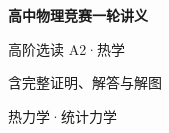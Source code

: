 \documentclass[UTF8,zihao=-4,oneside,openany]{ctexbook}
\begin{document}
\frontmatter
\begin{titlepage}
  \centering
  \vspace*{0.25\textheight}
  {\Huge\bfseries 高中物理竞赛一轮讲义\par}
  \vspace{1.2em}
  {\Large 高阶选读 A2·热学\par}
  \vspace{0.8em}
  {\large 含完整证明、解答与解图\par}
  \vfill
  {\color{TextGray}热力学·统计力学\par}
\end{titlepage}
\tableofcontents
\mainmatter

\end{document}
